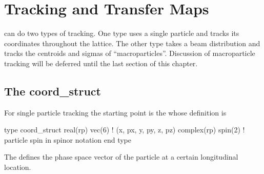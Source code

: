 \chapter{Tracking and Transfer Maps}
\label{c:tracking}

\bmad can do two types of tracking. One type uses a single particle
and tracks its coordinates throughout the lattice. The other type
takes a beam distribution and tracks the centroids and sigmas of
``macroparticles''. Discussion of macroparticle tracking will be
deferred until the last section of this chapter.

\section{The coord_struct}

For single particle tracking the starting point is the
 whose definition is 
\begin{example}
  type coord_struct
    real(rp) vec(6)     ! (x, px, y, py, z, pz)
    complex(rp) spin(2) ! particle spin in spinor notation
  end type
\end{example}
The  defines the phase
space vector of the particle at a certain longitudinal location.

